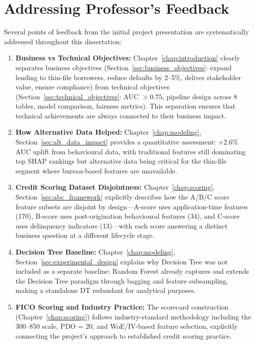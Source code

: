\section{Addressing Professor's Feedback}
\label{sec:feedback}

Several points of feedback from the initial project presentation are systematically addressed throughout this dissertation:

\begin{enumerate}
    \item \textbf{Business vs Technical Objectives:} Chapter~\ref{chap:introduction} clearly separates business objectives (Section~\ref{sec:business_objectives}: expand lending to thin-file borrowers, reduce defaults by 2--5\%, deliver stakeholder value, ensure compliance) from technical objectives (Section~\ref{sec:technical_objectives}: AUC $> 0.75$, pipeline design across 8 tables, model comparison, fairness metrics). This separation ensures that technical achievements are always connected to their business impact.

    \item \textbf{How Alternative Data Helped:} Chapter~\ref{chap:modeling}, Section~\ref{sec:alt_data_impact} provides a quantitative assessment: +2.6\% AUC uplift from behavioural data, with traditional features still dominating top SHAP rankings but alternative data being critical for the thin-file segment where bureau-based features are unavailable.

    \item \textbf{Credit Scoring Dataset Disjointness:} Chapter~\ref{chap:scoring}, Section~\ref{sec:abc_framework} explicitly describes how the A/B/C score feature subsets are disjoint by design---A-score uses application-time features (170), B-score uses post-origination behavioural features (34), and C-score uses delinquency indicators (13)---with each score answering a distinct business question at a different lifecycle stage.

    \item \textbf{Decision Tree Baseline:} Chapter~\ref{chap:modeling}, Section~\ref{sec:experimental_design} explains why Decision Tree was not included as a separate baseline: Random Forest already captures and extends the Decision Tree paradigm through bagging and feature subsampling, making a standalone DT redundant for analytical purposes.

    \item \textbf{FICO Scoring and Industry Practice:} The scorecard construction (Chapter~\ref{chap:scoring}) follows industry-standard methodology including the 300--850 scale, PDO = 20, and WoE/IV-based feature selection, explicitly connecting the project's approach to established credit scoring practice.
\end{enumerate}

